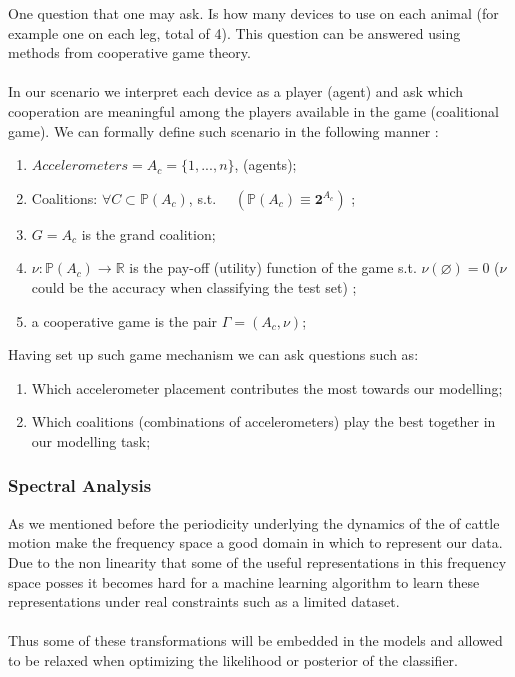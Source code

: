 \documentclass[10pt]{article}
\begin{document}
 One question that one may ask. Is how many devices to use on each animal (for example one on each leg, total of 4). This question can be answered using methods from cooperative game theory. 
\\ \\ 
 In our scenario we interpret each device as a player (agent) and ask which cooperation are meaningful among the players available in the game (coalitional game). We can formally define such scenario in the following manner : 
 
 
 
\begin{enumerate}
\item  $Accelerometers= A_{c} = \{1, ... , n\}$,  (agents);
\item  Coalitions: $\forall C \subset \mathbb{P}(A_{c})$,\; s.t. $\quad  (\mathbb{P}(A_{c}) \equiv \boldsymbol{2}^{A_{c}})$ ; 
\item $G = A_{c}$ is the grand coalition;
\item $\nu : \mathbb{P}(A_{c}) \rightarrow \mathbb{R}$ is the pay-off (utility) function of the game  s.t. $\nu(\varnothing) =0$ ($\nu$ could be the accuracy when classifying the test set) ; 
\item a cooperative game is the pair $\Gamma = (A_{c}, \nu)$;
\end{enumerate}

\noindent
{ Having set up such game mechanism we can ask questions such as:}


\begin{enumerate}
\item Which accelerometer placement contributes the most towards our modelling;
\item Which coalitions (combinations of accelerometers) play the best together in our modelling task;
\end{enumerate}
 

\subsubsection{Spectral Analysis}

As we mentioned before the periodicity underlying the dynamics of the of cattle motion make the frequency space a good domain in which to represent our data.\\


Due to the non linearity that some of the useful representations in this frequency space posses it becomes hard for a machine learning algorithm to learn these representations under real constraints such as a limited dataset.
\\ \\
 Thus some of these transformations will be embedded in the models and allowed to be relaxed when optimizing the likelihood or posterior of the classifier.
\end{document}
